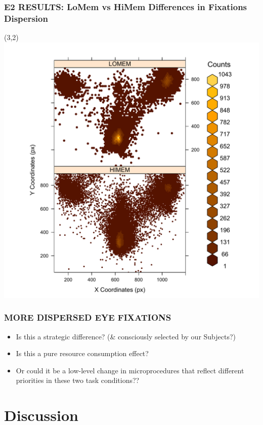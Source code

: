 \documentclass{beamer}
\begin{document}
\begin{frame} 
	\frametitle{E2 RESULTS: LoMem vs HiMem Differences in Fixations Dispersion}
	  \begin{textblock}{5.5}(3,2)	
  		\includegraphics[scale=.45]{../zNvBkFigs/Rplot_hexbinplot_db_hl}
    	  \end{textblock} 
\end{frame}


\begin{frame} 
	\frametitle{MORE DISPERSED EYE FIXATIONS}
	\begin{itemize}
		\item Is this a strategic difference? (\& consciously selected by our Subjects?)
		\pause
		\item Is this a pure resource consumption effect?
		\pause
		\item Or could it be a low-level change in microprocedures that reflect different priorities in these two task conditions??
 	\end{itemize}
\end{frame}

\section{Discussion}
\end{document}

